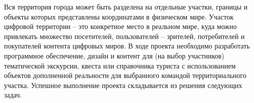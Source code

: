 Вся территория города может быть разделена на отдельные участки, границы и объекты которых представлены координатами в физическом мире.  Участок цифровой территории – это конкретное место в реальном мире, куда можно привлекать множество посетителей, пользователей – зрителей, потребителей и покупателей контента цифровых миров. В ходе проекта необходимо разработать программное обеспечение, дизайн и контент  для (на выбор участников)  тематической экскурсии, квеста или справочника туриста с использованием объектов дополненной реальности для выбранного командой территориального участка. Успешное выполнение проекта складывается из решения следующих задач.